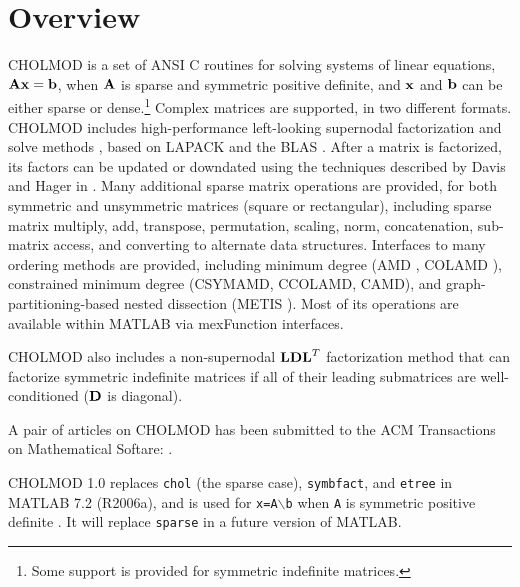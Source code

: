 \documentclass[11pt]{article}
\newcommand{\m}[1]{{\bf{#1}}}       %
\begin{document}
\newpage
\tableofcontents

\newpage \section{Overview}

CHOLMOD is a set of ANSI C routines for solving systems of linear
equations, $\m{Ax}=\m{b}$, when $\m{A}$ is sparse and symmetric positive definite,
and $\m{x}$ and $\m{b}$ can be either sparse or dense.\footnote{Some support
is provided for symmetric indefinite matrices.}
Complex matrices are supported, in two different formats.
CHOLMOD includes high-performance left-looking supernodal factorization
and solve methods \cite{NgPeyton91b},
based on LAPACK \cite{LAPACK} and the BLAS \cite{ACM679a}.
After a matrix is factorized, its factors can be updated or downdated using
the techniques described by Davis and Hager
in \cite{DavisHager99,DavisHager01,DavisHager05}.
Many additional sparse matrix operations are provided, for both
symmetric and unsymmetric matrices (square or rectangular), including
sparse matrix multiply, add, transpose, permutation, scaling,
norm, concatenation, sub-matrix access, and converting to alternate data structures.
Interfaces to many ordering methods are provided, including minimum degree
(AMD \cite{AmestoyDavisDuff96,AmestoyDavisDuff03},
COLAMD \cite{DavisGilbertLarimoreNg00_algo,DavisGilbertLarimoreNg00}),
constrained minimum degree (CSYMAMD, CCOLAMD, CAMD), and
graph-partitioning-based nested dissection (METIS \cite{KarypisKumar98}).
Most of its operations are available within MATLAB via mexFunction interfaces.

    CHOLMOD also includes a non-supernodal $\m{LDL}^T$ factorization method
    that can factorize symmetric indefinite matrices if all of their
    leading submatrices are well-conditioned ($\m{D}$ is diagonal).

A pair of articles on CHOLMOD has been submitted to the ACM Transactions
on Mathematical Softare:
\cite{ChenDavisHagerRajamanickam06,DavisHager06}.

CHOLMOD 1.0 replaces {\tt chol} (the sparse case), {\tt symbfact}, and {\tt etree}
in MATLAB 7.2 (R2006a), and is used for {\tt x=A}$\backslash${\tt b}
when {\tt A} is symmetric positive definite \cite{GilbertMolerSchreiber}.
It will replace {\tt sparse} in a future version of MATLAB.
\end{document}
